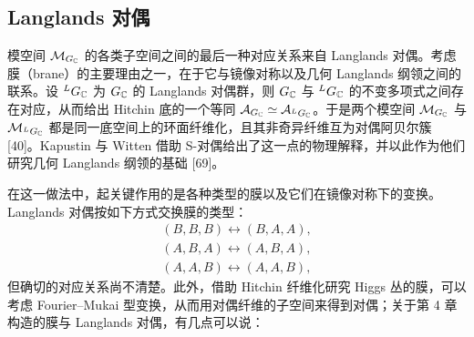
\subsection{Langlands 对偶}

模空间 $\mathcal{M}_{G_{\mathbb{C}}}$ 的各类子空间之间的最后一种对应关系来自 Langlands 对偶。考虑膜（brane）的主要理由之一，在于它与镜像对称以及几何 Langlands 纲领之间的联系。设 ${}^{L}G_{\mathbb{C}}$ 为 $G_{\mathbb{C}}$ 的 Langlands 对偶群，则 $G_{\mathbb{C}}$ 与 ${}^{L}G_{\mathbb{C}}$ 的不变多项式之间存在对应，从而给出 Hitchin 底的一个等同 $\mathcal{A}_{G_{\mathbb{C}}} \simeq \mathcal{A}_{{}^{L}G_{\mathbb{C}}}$。于是两个模空间 $\mathcal{M}_{G_{\mathbb{C}}}$ 与 $\mathcal{M}_{{}^{L}G_{\mathbb{C}}}$ 都是同一底空间上的环面纤维化，且其非奇异纤维互为对偶阿贝尔簇 [40]。Kapustin 与 Witten 借助 S-对偶给出了这一点的物理解释，并以此作为他们研究几何 Langlands 纲领的基础 [69]。


在这一做法中，起关键作用的是各种类型的膜以及它们在镜像对称下的变换。Langlands 对偶按如下方式交换膜的类型：
\[
\begin{gathered}
(B,B,B) \leftrightarrow (B,A,A),\\
(A,B,A) \leftrightarrow (A,B,A),\\
(A,A,B) \leftrightarrow (A,A,B),
\end{gathered}
\]
但确切的对应关系尚不清楚。此外，借助 Hitchin 纤维化研究 Higgs 丛的膜，可以考虑 Fourier--Mukai 型变换，从而用对偶纤维的子空间来得到对偶；关于第 4 章构造的膜与 Langlands 对偶，有几点可以说：

